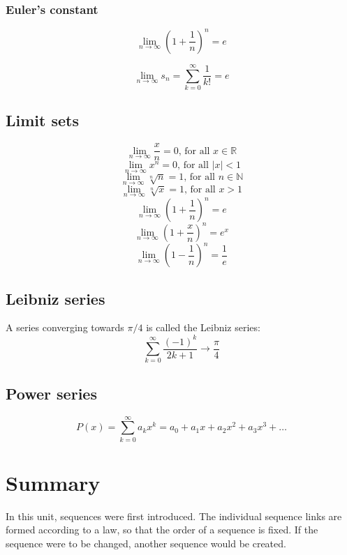 \documentclass{book}
\begin{document}
\subsubsection{Euler's constant}
\[
  \lim\limits_{n\to\infty}\left(1+\frac{1}{n}\right)^{n}=e
\]

\[
  \lim\limits_{n\to\infty}s_{n}=\sum_{k=0}^{\infty}\frac{1}{k!}=e
\]

\subsection{Limit sets}
\[
  \lim\limits_{n\to \infty} \frac{x}{n}=0\text{, for all }x\in\mathbb{R}
\]
\[
  \lim\limits_{n\to \infty} x^n=0\text{, for all }|x|<1
\]
\[
  \lim\limits_{n\to \infty} \sqrt[n]{n}=1\text{, for all }n\in\mathbb{N}
\]
\[
  \lim\limits_{n\to \infty} \sqrt[n]{x}=1\text{, for all }x>1
\]
\[
  \lim\limits_{n\to \infty} \left(1+\frac{1}{n}\right)^n=e
\]
\[
  \lim\limits_{n\to \infty} \left(1+\frac{x}{n}\right)^n=e^x
\]
\[
  \lim\limits_{n\to \infty} \left(1-\frac{1}{n}\right)^n=\frac{1}{e}
\]

\subsection{Leibniz series}
A series converging towards $\pi/4$ is called the Leibniz series:
\[
  \sum_{k=0}^{\infty}\frac{(-1)^k}{2k+1}\to\frac{\pi}{4}
\]

\subsection{Power series}
\[
  P(x) = \sum_{k=0}^{\infty}a_{k}x^{k}=a_0+a_1x+a_2x^2+a_3x^3+\dots
\]

\section{Summary}
In this unit, sequences were first introduced. The individual sequence links are formed according to a law, so that the order of a sequence is fixed. If the sequence were to be changed, another sequence would be created.
\end{document}
